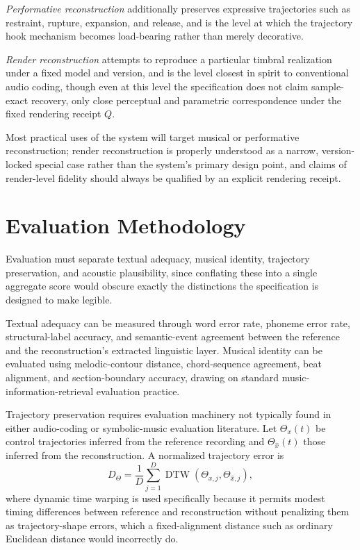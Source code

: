 \documentclass[11pt]{article}
\DeclareMathOperator{\DTW}{DTW}
\begin{document}
\emph{Performative reconstruction} additionally preserves expressive trajectories such as restraint, rupture, expansion, and release, and is the level at which the trajectory hook mechanism becomes load-bearing rather than merely decorative.

\emph{Render reconstruction} attempts to reproduce a particular timbral realization under a fixed model and version, and is the level closest in spirit to conventional audio coding, though even at this level the specification does not claim sample-exact recovery, only close perceptual and parametric correspondence under the fixed rendering receipt $Q$.

Most practical uses of the system will target musical or performative reconstruction; render reconstruction is properly understood as a narrow, version-locked special case rather than the system's primary design point, and claims of render-level fidelity should always be qualified by an explicit rendering receipt.

\section{Evaluation Methodology}
\label{sec:evaluation}

Evaluation must separate textual adequacy, musical identity, trajectory preservation, and acoustic plausibility, since conflating these into a single aggregate score would obscure exactly the distinctions the specification is designed to make legible.

Textual adequacy can be measured through word error rate, phoneme error rate, structural-label accuracy, and semantic-event agreement between the reference and the reconstruction's extracted linguistic layer. Musical identity can be evaluated using melodic-contour distance, chord-sequence agreement, beat alignment, and section-boundary accuracy, drawing on standard music-information-retrieval evaluation practice.

Trajectory preservation requires evaluation machinery not typically found in either audio-coding or symbolic-music evaluation literature. Let $\Theta_x(t)$ be control trajectories inferred from the reference recording and $\Theta_{\hat{x}}(t)$ those inferred from the reconstruction. A normalized trajectory error is
\[
D_\Theta
=
\frac{1}{D}
\sum_{j=1}^{D}
\DTW
\left(
\Theta_{x,j},
\Theta_{\hat{x},j}
\right),
\]
where dynamic time warping is used specifically because it permits modest timing differences between reference and reconstruction without penalizing them as trajectory-shape errors, which a fixed-alignment distance such as ordinary Euclidean distance would incorrectly do.
\end{document}
